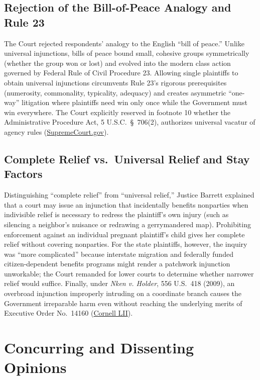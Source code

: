 \documentclass[12pt]{article}
\begin{document}
\subsection{Rejection of the Bill-of-Peace Analogy and Rule 23}
The Court rejected respondents' analogy to the English ``bill of peace.'' Unlike universal injunctions, bills of peace bound small, cohesive groups symmetrically (whether the group won or lost) and evolved into the modern class action governed by Federal Rule of Civil Procedure 23. Allowing single plaintiffs to obtain universal injunctions circumvents Rule 23's rigorous prerequisites (numerosity, commonality, typicality, adequacy) and creates asymmetric ``one-way'' litigation where plaintiffs need win only once while the Government must win everywhere. The Court explicitly reserved in footnote 10 whether the Administrative Procedure Act, 5 U.S.C.\ \S\ 706(2), authorizes universal vacatur of agency rules (\href{https://www.supremecourt.gov/opinions/24pdf/606us2r66_j426.pdf}{SupremeCourt.gov}).

\subsection{Complete Relief vs.\ Universal Relief and Stay Factors}
Distinguishing ``complete relief'' from ``universal relief,'' Justice Barrett explained that a court may issue an injunction that incidentally benefits nonparties when indivisible relief is necessary to redress the plaintiff's own injury (such as silencing a neighbor's nuisance or redrawing a gerrymandered map). Prohibiting enforcement against an individual pregnant plaintiff's child gives her complete relief without covering nonparties. For the state plaintiffs, however, the inquiry was ``more complicated'' because interstate migration and federally funded citizen-dependent benefits programs might render a patchwork injunction unworkable; the Court remanded for lower courts to determine whether narrower relief would suffice. Finally, under \textit{Nken v. Holder}, 556 U.S.\ 418 (2009), an overbroad injunction improperly intruding on a coordinate branch causes the Government irreparable harm even without reaching the underlying merits of Executive Order No.\ 14160 (\href{https://www.law.cornell.edu/supremecourt/text/24A884}{Cornell LII}).

\section{Concurring and Dissenting Opinions}
\end{document}
